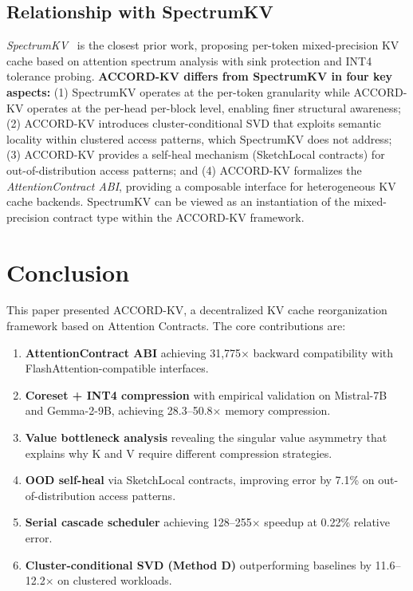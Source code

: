 \documentclass[11pt, a4paper, oneside]{article}
\theoremstyle{myplain}
\theoremstyle{mydefinition}
\theoremstyle{myremark}
\begin{document}
\subsection{Relationship with SpectrumKV}

\textit{SpectrumKV}~\cite{yang2025spectrumkv} is the closest prior work, proposing per-token mixed-precision KV cache based on attention spectrum analysis with sink protection and INT4 tolerance probing. \textbf{ACCORD-KV differs from SpectrumKV in four key aspects:} (1) SpectrumKV operates at the per-token granularity while ACCORD-KV operates at the per-head per-block level, enabling finer structural awareness; (2) ACCORD-KV introduces cluster-conditional SVD that exploits semantic locality within clustered access patterns, which SpectrumKV does not address; (3) ACCORD-KV provides a self-heal mechanism (SketchLocal contracts) for out-of-distribution access patterns; and (4) ACCORD-KV formalizes the \textit{AttentionContract ABI}, providing a composable interface for heterogeneous KV cache backends. SpectrumKV can be viewed as an instantiation of the mixed-precision contract type within the ACCORD-KV framework.

\section{Conclusion}

This paper presented ACCORD-KV, a decentralized KV cache reorganization framework based on Attention Contracts. The core contributions are:

\begin{enumerate}
    \item \textbf{AttentionContract ABI} achieving 31,775$\times$ backward compatibility with FlashAttention-compatible interfaces.
    \item \textbf{Coreset + INT4 compression} with empirical validation on Mistral-7B and Gemma-2-9B, achieving 28.3--50.8$\times$ memory compression.
    \item \textbf{Value bottleneck analysis} revealing the singular value asymmetry that explains why K and V require different compression strategies.
    \item \textbf{OOD self-heal} via SketchLocal contracts, improving error by 7.1\% on out-of-distribution access patterns.
    \item \textbf{Serial cascade scheduler} achieving 128--255$\times$ speedup at 0.22\% relative error.
    \item \textbf{Cluster-conditional SVD (Method D)} outperforming baselines by 11.6--12.2$\times$ on clustered workloads.
\end{enumerate}
\end{document}
